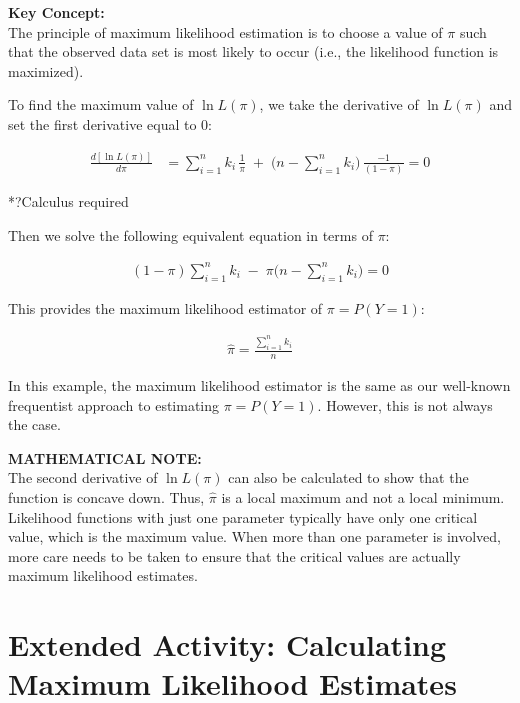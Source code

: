 \documentclass[
]{report}
\begin{document}
\textbf{Key Concept:}\\
The principle of maximum likelihood estimation is to choose a value of \(\pi\) such that the observed data set is most likely to occur (i.e., the likelihood function is maximized).\\
\normalsize

To find the maximum value of \(\ln L(\pi)\), we take the derivative of \(\ln L(\pi)\) and set the first derivative equal to 0:

\begin{align}
\frac{d[\ln L(\pi)]}{d\pi}
&= \sum_{i=1}^n k_i \,\frac{1}{\pi} \;+\;\bigl(n - \sum_{i=1}^n k_i\bigr)\,\frac{-1}{(1 - \pi)} = 0
\tag{6.29}
\end{align}

*?Calculus required

Then we solve the following equivalent equation in terms of \(\pi\):

\begin{align}
(1 - \pi)\sum_{i=1}^n k_i \;-\;\pi\bigl(n - \sum_{i=1}^n k_i\bigr) = 0
\tag{6.30}
\end{align}

This provides the maximum likelihood estimator of \(\pi = P(Y = 1)\):

\begin{align}
\displaystyle \hat{\pi} = \frac{\sum_{i=1}^n k_i}{n}
\tag{6.31}
\end{align}

In this example, the maximum likelihood estimator is the same as our well-known frequentist approach to estimating \(\pi = P(Y = 1)\). However, this is not always the case.

\large

\textbf{MATHEMATICAL NOTE:}\\
The second derivative of \(\ln L(\pi)\) can also be calculated to show that the function is concave down. Thus, \(\hat{\pi}\) is a local maximum and not a local minimum. Likelihood functions with just one parameter typically have only one critical value, which is the maximum value. When more than one parameter is involved, more care needs to be taken to ensure that the critical values are actually maximum likelihood estimates.\\
\normalsize

\hypertarget{extended-activity-calculating-maximum-likelihood-estimates}{%
\section*{Extended Activity: Calculating Maximum Likelihood Estimates}\label{extended-activity-calculating-maximum-likelihood-estimates}}
\end{document}

